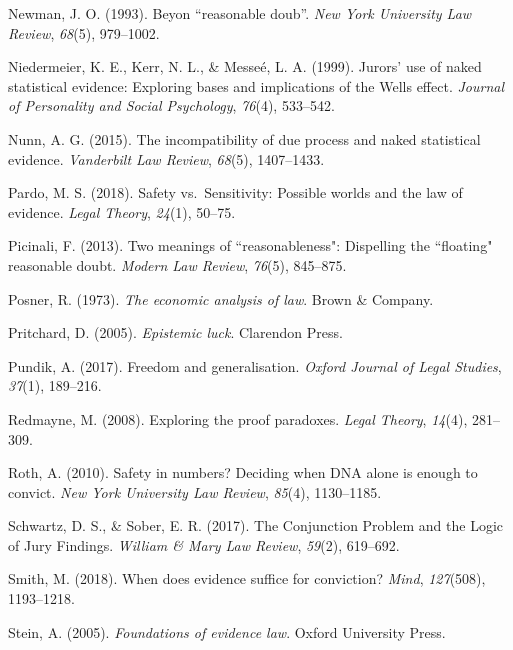 \documentclass[10pt,dvipsnames,enabledeprecatedfontcommands]{scrartcl}
\begin{document}
\leavevmode\hypertarget{ref-newman1993}{}%
Newman, J. O. (1993). Beyon ``reasonable doub''. \emph{New York
University Law Review}, \emph{68}(5), 979--1002.

\leavevmode\hypertarget{ref-niedermeierEtAl1999}{}%
Niedermeier, K. E., Kerr, N. L., \& Messeé, L. A. (1999). Jurors' use of
naked statistical evidence: Exploring bases and implications of the
Wells effect. \emph{Journal of Personality and Social Psychology},
\emph{76}(4), 533--542.

\leavevmode\hypertarget{ref-nunn2015}{}%
Nunn, A. G. (2015). The incompatibility of due process and naked
statistical evidence. \emph{Vanderbilt Law Review}, \emph{68}(5),
1407--1433.

\leavevmode\hypertarget{ref-pardo2018}{}%
Pardo, M. S. (2018). Safety vs.~Sensitivity: Possible worlds and the law
of evidence. \emph{Legal Theory}, \emph{24}(1), 50--75.

\leavevmode\hypertarget{ref-picinali2013}{}%
Picinali, F. (2013). Two meanings of ``reasonableness": Dispelling the
``floating" reasonable doubt. \emph{Modern Law Review}, \emph{76}(5),
845--875.

\leavevmode\hypertarget{ref-Posner1973}{}%
Posner, R. (1973). \emph{The economic analysis of law}. Brown \&
Company.

\leavevmode\hypertarget{ref-pritchard2005epistemic}{}%
Pritchard, D. (2005). \emph{Epistemic luck}. Clarendon Press.

\leavevmode\hypertarget{ref-pundik2017}{}%
Pundik, A. (2017). Freedom and generalisation. \emph{Oxford Journal of
Legal Studies}, \emph{37}(1), 189--216.

\leavevmode\hypertarget{ref-redmayne2008exploring}{}%
Redmayne, M. (2008). Exploring the proof paradoxes. \emph{Legal Theory},
\emph{14}(4), 281--309.

\leavevmode\hypertarget{ref-Roth2010}{}%
Roth, A. (2010). Safety in numbers? Deciding when DNA alone is enough to
convict. \emph{New York University Law Review}, \emph{85}(4),
1130--1185.

\leavevmode\hypertarget{ref-schwartz2017ConjunctionProblemLogic}{}%
Schwartz, D. S., \& Sober, E. R. (2017). The Conjunction Problem and the
Logic of Jury Findings. \emph{William \& Mary Law Review}, \emph{59}(2),
619--692.

\leavevmode\hypertarget{ref-smith2017}{}%
Smith, M. (2018). When does evidence suffice for conviction?
\emph{Mind}, \emph{127}(508), 1193--1218.

\leavevmode\hypertarget{ref-Stein05}{}%
Stein, A. (2005). \emph{Foundations of evidence law}. Oxford University
Press.
\end{document}
